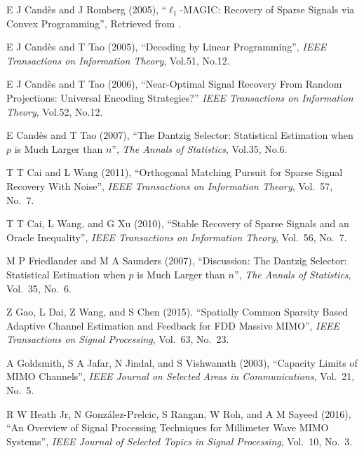 \item E J Cand\`es and J Romberg (2005), ``\(\ell_1\)-MAGIC: Recovery of Sparse Signals via Convex Programming'', Retrieved from .

\item E J Cand\`es and T Tao (2005), ``Decoding by Linear Programming'', {\it IEEE Transactions on Information Theory}, Vol.51, No.12.

\item E J Cand\`es and T Tao (2006), ``Near-Optimal Signal Recovery From Random Projections: Universal Encoding Strategies?'' {\it IEEE Transactions on Information Theory}, Vol.52, No.12.

\item E Cand\`es and T Tao (2007), ``The Dantzig Selector: Statistical Estimation when \(p\) is Much Larger than \(n\)'', {\it The Annals of Statistics}, Vol.35, No.6.

\item T T Cai and L Wang (2011), ``Orthogonal Matching Pursuit for Sparse Signal Recovery With Noise'', {\it IEEE Transactions on Information Theory}, Vol.\ 57, No.\ 7.

\item T T Cai, L Wang, and G Xu (2010), ``Stable Recovery of Sparse Signals and an Oracle Inequality'', {\it IEEE Transactions on Information Theory}, Vol.\ 56, No.\ 7.

\item M P Friedlander and M A Saunders (2007), ``Discussion: The Dantzig Selector: Statistical Estimation when \(p\) is Much Larger than \(n\)'', {\it The Annals of Statistics}, Vol.\ 35, No.\ 6.

\item Z Gao, L Dai, Z Wang, and S Chen (2015). ``Spatially Common Sparsity Based Adaptive Channel Estimation and Feedback for FDD Massive MIMO'', {\it IEEE Transactions on Signal Processing}, Vol.\ 63, No.\ 23.

\item A Goldsmith, S A Jafar, N Jindal, and S Vishwanath (2003), ``Capacity Limits of MIMO Channels'', {\it IEEE Journal on Selected Areas in Communications}, Vol.\ 21, No.\ 5.

\item R W Heath Jr, N González-Prelcic, S Rangan, W Roh, and A M Sayeed (2016), ``An Overview of Signal Processing Techniques for Millimeter Wave MIMO Systems'', {\it IEEE Journal of Selected Topics in Signal Processing}, Vol.\ 10, No.\ 3.

